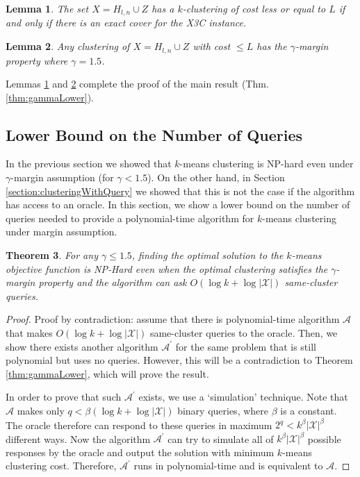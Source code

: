 \documentclass{article}
\newcommand{\mc}{\mathcal}
\newtheorem{theorem}{Theorem}
\newtheorem{lemma}[theorem]{Lemma}
\begin{document}
\begin{lemma}
\label{lemma:kmeansEquivalenceX3C}
The set $X = H_{l,n} \cup Z$ has a $k$-clustering of cost less or equal to $L$ if and only if there is an exact cover for the X3C instance.
\end{lemma}

\begin{lemma}
\label{lemma:gammaLower}
Any clustering of $X = H_{l,n} \cup Z$ with cost $\le L$ has the $\gamma$-margin property where $\gamma = 1.5$.
\end{lemma}

Lemmas \ref{lemma:kmeansEquivalenceX3C} and \ref{lemma:gammaLower} complete the proof of the main result (Thm. \ref{thm:gammaLower}). 

\subsection{Lower Bound on the Number of Queries}

In the previous section we showed that $k$-means clustering is NP-hard even under $\gamma$-margin assumption (for $\gamma < 1.5$). On the other hand, in Section \ref{section:clusteringWithQuery} we showed that this is not the case if the algorithm has access to an oracle. In this section, we show a lower bound on the number of queries needed to provide a polynomial-time algorithm for $k$-means clustering under margin assumption.

\begin{theorem}
\label{thm:queryLower}
For any $\gamma \le 1.5$, finding the optimal solution to the $k$-means objective function is NP-Hard even when the optimal clustering satisfies the $\gamma$-margin property and the algorithm can ask $O(\log k + \log |\mc X|)$ same-cluster queries.
\end{theorem}
\begin{proof}
Proof by contradiction: assume that there is polynomial-time algorithm $\mc A$ that makes $O(\log k + \log |\mc X|)$ same-cluster queries to the oracle. Then, we show there exists another algorithm $\mc A^\prime$ for the same problem that is still polynomial but uses no queries. However, this will be a contradiction to Theorem \ref{thm:gammaLower}, which will prove the result.

In order to prove that such $\mc A^\prime$ exists, we use a `simulation' technique. Note that $\mc A$ makes only $q<\beta(\log k + \log |\mc X|)$ binary queries, where $\beta$ is a constant. The oracle therefore can respond to these queries in maximum $2^{q} < k^\beta|\mc X|^\beta$ different ways. Now the algorithm $\mc A^\prime$ can try to simulate all of $k^\beta|\mc X|^\beta$ possible responses by the oracle and output the solution with minimum $k$-means clustering cost. Therefore, $\mc A^\prime$ runs in polynomial-time and is equivalent to $\mc A$.
\end{proof}
\end{document}
